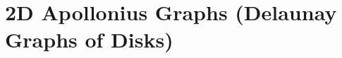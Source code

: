 
\chapter{2D Apollonius Graphs (Delaunay Graphs of Disks)}
\label{chapter-apollonius2}


\minitoc



%
